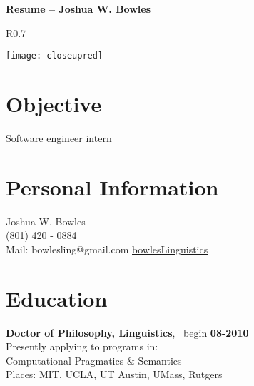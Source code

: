 \documentclass[margin,line,a4paper]{resume}
\begin{document}
{\sc \Large {\bf Resume -- Joshua W. Bowles}}
\begin{resume}
    \vspace{0.5cm}
    \begin{wrapfigure}{R}{0.7\textwidth}
         \vspace{-1cm}
        \begin{center}
        \texttt{[image: closeupred]}
        \end{center}
         \vspace{-1cm}
    \end{wrapfigure}
\section{Objective}
Software engineer intern

\section{Personal Information}
Joshua W. Bowles\\
(801) 420 - 0884\\
Mail: bowlesling@gmail.com
\href{http://sites.google.com/site/bowleslinguistics/Home}{bowlesLinguistics}\\ 
  

\section{Education}
{\bf Doctor of Philosophy, Linguistics}, \ begin {\bf 08-2010}\\ 
Presently applying to programs in:\\ Computational Pragmatics \& Semantics\\ Places: MIT, UCLA, UT Austin, UMass, Rutgers  


\end{resume}
\end{document}
